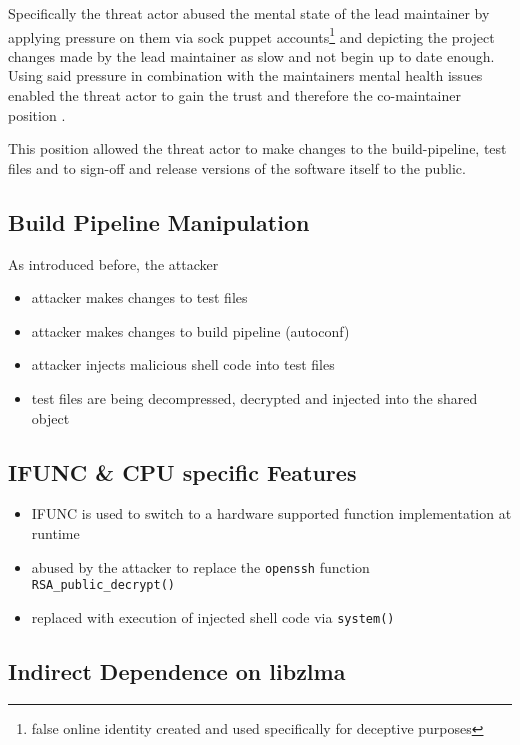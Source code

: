 Specifically the threat actor abused the mental state of the lead maintainer by
applying pressure on them via sock puppet accounts\footnote{false online
identity created and used specifically for deceptive purposes} and depicting
the project changes made by the lead maintainer as slow and not begin up to
date enough. Using said pressure in combination with the maintainers mental
health issues enabled the threat actor to gain the trust and therefore the
co-maintainer position \cite{arstechnica2024xzutils}. 

This position allowed the threat actor to make changes to the build-pipeline,
test files and to sign-off and release versions of the software itself to the
public.

\subsection{Build Pipeline Manipulation}

As introduced before, the attacker 

\begin{itemize}
    \item attacker makes changes to test files 
    \item attacker makes changes to build pipeline (autoconf)
    \item attacker injects malicious shell code into test files
    \item test files are being decompressed, decrypted and injected into the shared object 
\end{itemize}

\subsection{IFUNC \& CPU specific Features}

\begin{itemize}
    \item IFUNC is used to switch to a hardware supported function implementation at runtime
    \item abused by the attacker to replace the \texttt{openssh} function \texttt{RSA\_public\_decrypt()}
    \item replaced with execution of injected shell code via \texttt{system()}
\end{itemize}

\subsection{Indirect Dependence on libzlma}


